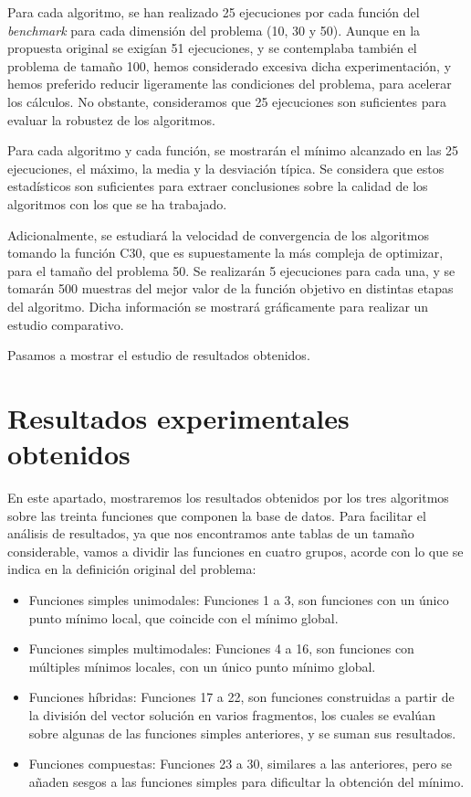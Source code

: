\documentclass[
  a4paper,
,tablecaptionabove
]{scrartcl}
\providecommand{\tightlist}{%
  \setlength{\itemsep}{0pt}\setlength{\parskip}{0pt}}
\begin{document}
Para cada algoritmo, se han realizado 25 ejecuciones por cada función
del \emph{benchmark} para cada dimensión del problema (10, 30 y 50).
Aunque en la propuesta original se exigían 51 ejecuciones, y se
contemplaba también el problema de tamaño 100, hemos considerado
excesiva dicha experimentación, y hemos preferido reducir ligeramente
las condiciones del problema, para acelerar los cálculos. No obstante,
consideramos que 25 ejecuciones son suficientes para evaluar la robustez
de los algoritmos.

Para cada algoritmo y cada función, se mostrarán el mínimo alcanzado en
las 25 ejecuciones, el máximo, la media y la desviación típica. Se
considera que estos estadísticos son suficientes para extraer
conclusiones sobre la calidad de los algoritmos con los que se ha
trabajado.

Adicionalmente, se estudiará la velocidad de convergencia de los
algoritmos tomando la función C30, que es supuestamente la más compleja
de optimizar, para el tamaño del problema 50. Se realizarán 5
ejecuciones para cada una, y se tomarán 500 muestras del mejor valor de
la función objetivo en distintas etapas del algoritmo. Dicha información
se mostrará gráficamente para realizar un estudio comparativo.

Pasamos a mostrar el estudio de resultados obtenidos.

\hypertarget{resultados-experimentales-obtenidos}{%
\section{Resultados experimentales
obtenidos}\label{resultados-experimentales-obtenidos}}

En este apartado, mostraremos los resultados obtenidos por los tres
algoritmos sobre las treinta funciones que componen la base de datos.
Para facilitar el análisis de resultados, ya que nos encontramos ante
tablas de un tamaño considerable, vamos a dividir las funciones en
cuatro grupos, acorde con lo que se indica en la definición original del
problema:

\begin{itemize}
\tightlist
\item
  Funciones simples unimodales: Funciones 1 a 3, son funciones con un
  único punto mínimo local, que coincide con el mínimo global.
\item
  Funciones simples multimodales: Funciones 4 a 16, son funciones con
  múltiples mínimos locales, con un único punto mínimo global.
\item
  Funciones híbridas: Funciones 17 a 22, son funciones construidas a
  partir de la división del vector solución en varios fragmentos, los
  cuales se evalúan sobre algunas de las funciones simples anteriores, y
  se suman sus resultados.
\item
  Funciones compuestas: Funciones 23 a 30, similares a las anteriores,
  pero se añaden sesgos a las funciones simples para dificultar la
  obtención del mínimo.
\end{itemize}
\end{document}
